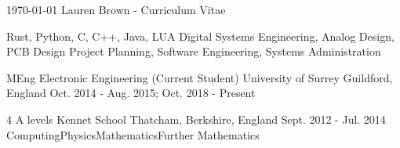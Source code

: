 \documentclass[11pt, a4paper]{awesome-cv}
\begin{document}
\makecvheader

\makecvfooter
  {\today}
  {Lauren Brown - Curriculum Vitae}
  {\thepage}


\begin{cvskills}
  {Rust, Python, C, C++, Java, LUA}
  {Digital Systems Engineering, Analog Design, PCB Design}
  {Project Planning, Software Engineering, Systems Administration}
\end{cvskills}

\begin{cventries}
  \cventry
    {MEng Electronic Engineering (Current Student)} %
    {University of Surrey} %
    {Guildford, England} %
    {Oct. 2014 - Aug. 2015; Oct. 2018 - Present} %
    {}
    
  \cventry
    {4 A levels} %
    {Kennet School} %
    {Thatcham, Berkshire, England} %
    {Sept. 2012 - Jul. 2014} %
    {
      Computing{\enskip\cdotp\enskip}Physics{\enskip\cdotp\enskip}Mathematics{\enskip\cdotp\enskip}Further Mathematics
    }
\end{cventries}
\end{document}
